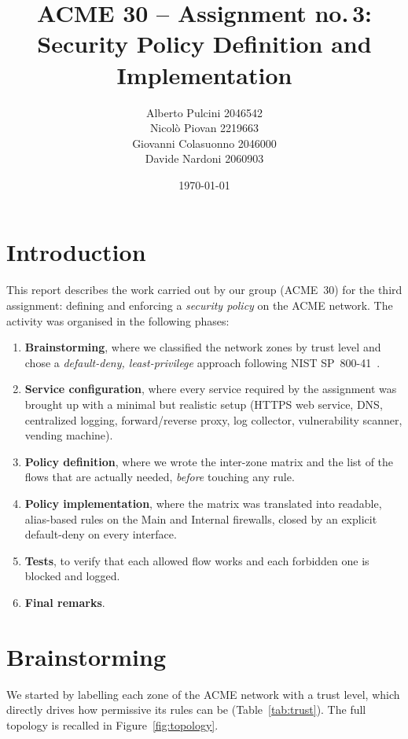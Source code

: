 \documentclass[twocolumn]{NobArticle}
\title{ACME 30 -- Assignment no.\,3: Security Policy Definition and Implementation}
\author{
    Alberto Pulcini 2046542 \\
    Nicolò Piovan 2219663 \\
    Giovanni Colasuonno 2046000 \\
    Davide Nardoni 2060903
}
\date{\today}
\begin{document}
\maketitle
\thispagestyle{empty}

\section{Introduction}

This report describes the work carried out by our group (ACME~30) for the third
assignment: defining and enforcing a \textit{security policy} on the ACME
network. The activity was organised in the following phases:

\begin{enumerate}
    \item \textbf{Brainstorming}, where we classified the network zones by trust
    level and chose a \textit{default-deny, least-privilege} approach following
    NIST SP~800-41~\cite{nist80041}.
    \item \textbf{Service configuration}, where every service required by the
    assignment was brought up with a minimal but realistic setup (HTTPS web
    service, DNS, centralized logging, forward/reverse proxy, log collector,
    vulnerability scanner, vending machine).
    \item \textbf{Policy definition}, where we wrote the inter-zone matrix and
    the list of the flows that are actually needed, \textit{before} touching any
    rule.
    \item \textbf{Policy implementation}, where the matrix was translated into
    readable, alias-based rules on the Main and Internal firewalls, closed by an
    explicit default-deny on every interface.
    \item \textbf{Tests}, to verify that each allowed flow works and each
    forbidden one is blocked and logged.
    \item \textbf{Final remarks}.
\end{enumerate}

\section{Brainstorming}

We started by labelling each zone of the ACME network with a trust level, which
directly drives how permissive its rules can be (Table~\ref{tab:trust}). The
full topology is recalled in Figure~\ref{fig:topology}.
\end{document}
